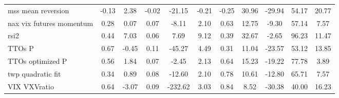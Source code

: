 \documentclass[12pt,a4paper, openany]{article}
\begin{document}
\begin{sidewaystable}
\begin{tabular}{l|cccccccccc}
  mss mean reversion & -0.13 & 2.38 & -0.02 & -21.15 & -0.21 & -0.25 & 30.96 & -29.94 & 54.17 & 20.77 \\ 
  nax vix futures momentum & 0.28 & 0.07 & 0.07 & -8.11 & 2.10 & 0.63 & 12.75 & -9.30 & 57.14 & 7.57 \\ 
  rsi2 & 0.44 & 7.03 & 0.06 & 7.69 & 9.12 & 0.39 & 32.67 & -2.65 & 96.23 & 11.47 \\ 
  TTOs P & 0.67 & -0.45 & 0.11 & -45.27 & 4.49 & 0.31 & 11.04 & -23.57 & 53.12 & 13.85 \\ 
  TTOs optimized P & 0.56 & 1.84 & 0.07 & -2.45 & 2.13 & 0.64 & 15.23 & -19.22 & 77.78 & 3.89 \\ 
  twp quadratic fit & 0.34 & 0.89 & 0.08 & -12.60 & 2.10 & 0.78 & 10.61 & -12.80 & 65.71 & 7.57 \\ 
  VIX VXVratio & 0.64 & -3.07 & 0.09 & -232.62 & 3.03 & 0.84 & 8.52 & -30.38 & 40.00 & 16.23 \\ 
  \hline
\end{tabular}
\end{sidewaystable}
\end{document}
